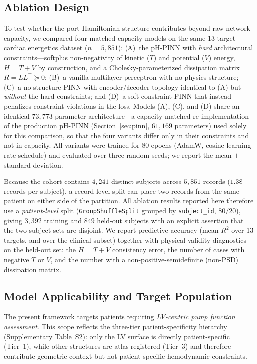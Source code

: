 \documentclass[journal]{IEEEtran}
\begin{document}
\subsection{Ablation Design}\label{sec:ablation}
To test whether the port-Hamiltonian structure contributes beyond raw network capacity, we compared four matched-capacity models on the same 13-target cardiac energetics dataset ($n=5{,}851$): (A)~the pH-PINN with \emph{hard} architectural constraints---softplus non-negativity of kinetic ($T$) and potential ($V$) energy, $H=T+V$ by construction, and a Cholesky-parameterized dissipation matrix $R=LL^{\top}\succeq0$; (B)~a vanilla multilayer perceptron with no physics structure; (C)~a no-structure PINN with encoder/decoder topology identical to (A) but \emph{without} the hard constraints; and (D)~a soft-constraint PINN that instead penalizes constraint violations in the loss. Models (A), (C), and (D) share an identical $73{,}773$-parameter architecture---a capacity-matched re-implementation of the production pH-PINN (Section~\ref{sec:pinn}, $61{,}169$ parameters) used solely for this comparison, so that the four variants differ only in their constraints and not in capacity. All variants were trained for 80 epochs (AdamW, cosine learning-rate schedule) and evaluated over three random seeds; we report the mean $\pm$ standard deviation.

Because the cohort contains $4{,}241$ distinct subjects across $5{,}851$ records ($1.38$ records per subject), a record-level split can place two records from the same patient on either side of the partition. All ablation results reported here therefore use a \emph{patient-level} split (\texttt{GroupShuffleSplit} grouped by \texttt{subject\_id}, $80/20$), giving $3{,}392$ training and $849$ held-out subjects with an explicit assertion that the two subject sets are disjoint. We report predictive accuracy (mean $R^2$ over 13 targets, and over the clinical subset) together with physical-validity diagnostics on the held-out set: the $H=T+V$ consistency error, the number of cases with negative $T$ or $V$, and the number with a non-positive-semidefinite (non-PSD) dissipation matrix.

\subsection{Model Applicability and Target Population}\label{sec:pop}
The present framework targets patients requiring \emph{LV-centric pump function assessment}. This scope reflects the three-tier patient-specificity hierarchy (Supplementary Table~S2): only the LV surface is directly patient-specific (Tier~1), while other structures are atlas-registered (Tier~3) and therefore contribute geometric context but not patient-specific hemodynamic constraints.
\end{document}
